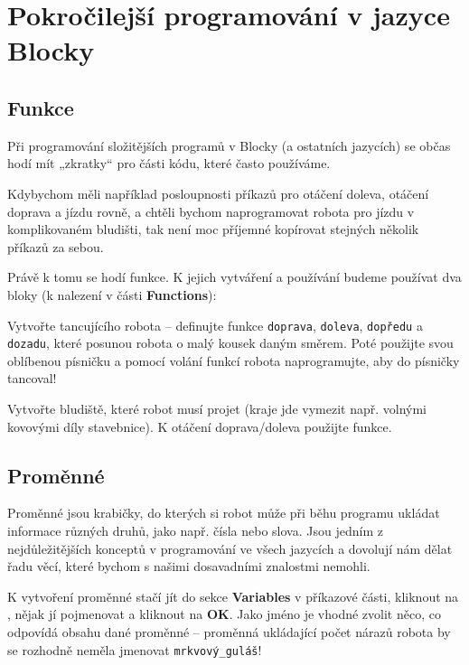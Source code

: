 \documentclass[../main.tex]{subfiles}
\begin{document}
	\section{Pokročilejší programování v jazyce Blocky}

	\subsection{Funkce}
	Při programování složitějších programů v Blocky (a ostatních jazycích) se občas hodí mít „zkratky“ pro části kódu, které často používáme.

	Kdybychom měli například posloupnosti příkazů pro otáčení doleva, otáčení doprava a jízdu rovně, a chtěli bychom naprogramovat robota pro jízdu v komplikovaném bludišti, tak není moc příjemné kopírovat stejných několik příkazů za sebou.

	Právě k tomu se hodí funkce. K jejich vytváření a používání budeme používat dva bloky (k nalezení v části \textbf{Functions}):
	\begin{itemize}
		\blockFunctionDefinition
		\blockFunctionCall
	\end{itemize}

	\begin{question}
		Vytvořte tancujícího robota -- definujte funkce \texttt{doprava}, \texttt{doleva}, \texttt{dopředu} a \texttt{dozadu}, které posunou robota o malý kousek daným směrem. Poté použijte svou oblíbenou písničku a pomocí volání funkcí robota naprogramujte, aby do písničky tancoval!
	\end{question}

	\begin{question*}
		Vytvořte bludiště, které robot musí projet (kraje jde vymezit např. volnými kovovými díly stavebnice). K otáčení doprava/doleva použijte funkce.
	\end{question*}

	\subsection{Proměnné}
	Proměnné jsou krabičky, do kterých si robot může při běhu programu ukládat informace různých druhů, jako např. čísla nebo slova. Jsou jedním z nejdůležitějších konceptů v programování ve všech jazycích a dovolují nám dělat řadu věcí, které bychom s našimi dosavadními znalostmi nemohli.

	K vytvoření proměnné stačí jít do sekce \textbf{Variables} v příkazové části, kliknout na , nějak jí pojmenovat a kliknout na \textbf{OK}. Jako jméno je vhodné zvolit něco, co odpovídá obsahu dané proměnné -- proměnná ukládající počet nárazů robota by se rozhodně neměla jmenovat \texttt{mrkvový\_guláš}!
\end{document}
